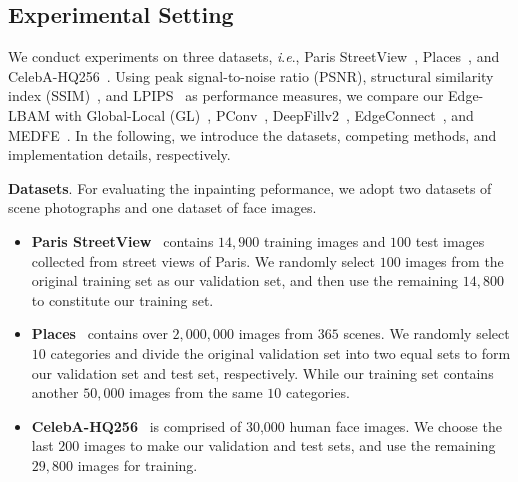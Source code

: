 \documentclass[10pt,journal,compsoc]{IEEEtran}
\newcommand{\ie}{\textit{i}.\textit{e}.}
\begin{document}
\subsection{Experimental Setting}\label{trainingdetails}
%
We conduct experiments on three datasets, \ie, Paris StreetView~\cite{doersch2015makes}, Places~\cite{zhou2017places}, and CelebA-HQ256~\cite{karras2017progressive}.
%
Using peak signal-to-noise ratio (PSNR), structural similarity index (SSIM)~\cite{wang2004image}, and LPIPS~\cite{zhang2018unreasonable} as performance measures, we compare our Edge-LBAM with Global-Local (GL)~\cite{IizukaGL}, PConv~\cite{partialconv2017}, DeepFillv2~\cite{yu2018free}, EdgeConnect~\cite{nazeri2019edgeconnect}, {and MEDFE~\cite{liu2020rethinking}}.
%
In the following, we introduce the datasets, competing methods, and implementation details, respectively.


{\textbf{Datasets}.} For evaluating the inpainting peformance, we adopt two datasets of scene photographs and one dataset of face images.
%
%
\begin{itemize}
  \item {\textbf{Paris StreetView}~\cite{doersch2015makes}} contains $14,900$ training images and $100$ test images collected from street views of Paris.
      We randomly select $100$ images from the original training set as our validation set, and then use the remaining $14,800$ to constitute our training set.
  \item {\textbf{Places}~\cite{zhou2017places}} contains over $2,000,000$ images from $365$ scenes.
      We randomly select $10$ categories and divide the original validation set into two equal sets to form our validation set and test set, respectively.
      While our training set contains another $50,000$ images from the same $10$ categories.
  \item {\textbf{CelebA-HQ256}~\cite{karras2017progressive}} is comprised of 30,000 human face images.
      We choose the last $200$ images to make our validation and test sets, and use the remaining $29,800$ images for training.
\end{itemize}
%

\end{document}
